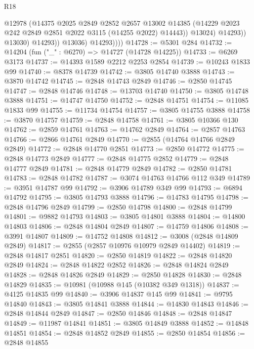 \begin{lexlean}{R18}
\begin{coremodule}
                          @12978
                          (@14375
                            @2025
                            @2849
                            @2852
                            @2657
                            @13002
                            @14385
                            (@14229 @2023 @242 @2849 @2851 @2022 @3115 (@14255 @2022) @14443))
                          @13024)
                        @14293))
                    @13030)
                  @14293))
              @13036)
            @14293))))
@14728 := @5301 @284
@14732 := @14204 (fun ("_" : @6270) => @14727 (@14728 @14225))
@14733 := @6269 @3173
@14737 := @14393 @1589 @2212 @2253 @2854
@14739 := @10243 @1833 @99
@14740 := @8378 @14739
@14742 := @3805 @14740 @3888
@14743 := @3870 @14742
@14745 := @2848 @14743 @2849
@14746 := @2850 @14745
@14747 := @2848 @14746
@14748 := @13703 @14740
@14750 := @3805 @14748 @3888
@14751 := @14747 @14750
@14752 := @2848 @14751
@14754 := @11085 @1833 @99
@14755 := @11734 @14754
@14757 := @3805 @14755 @3888
@14758 := @3870 @14757
@14759 := @2848 @14758
@14761 := @3805 @10366 @130
@14762 := @2859 @14761
@14763 := @14762 @2849
@14764 := @2857 @14763
@14766 := @2866 @14761 @2849
@14770 := @2855 (@14764 @14766 @2849 @2849)
@14772 := @2848 @14770 @2851
@14773 := @2850 @14772
@14775 := @2848 @14773 @2849
@14777 := @2848 @14775 @2852
@14779 := @2848 @14777 @2849
@14781 := @2848 @14779 @2849
@14782 := @2850 @14781
@14783 := @2848 @14782
@14787 := @3074 @14763 @14766 @112 @349
@14789 := @3951 @14787 @99
@14792 := @3906 @14789 @349 @99
@14793 := @6894 @14792
@14795 := @3805 @14793 @3888
@14796 := @14783 @14795
@14798 := @2848 @14796 @2849
@14799 := @2850 @14798
@14800 := @2848 @14799
@14801 := @9882 @14793
@14803 := @3805 @14801 @3888
@14804 := @14800 @14803
@14806 := @2848 @14804 @2849
@14807 := @14759 @14806
@14808 := @3991 @14807
@14809 := @14752 @14808
@14812 := @3008 (@2848 @14809 @2849)
@14817 := @2855 (@2857 @10976 @10979 @2849 @14402)
@14819 := @2848 @14817 @2851
@14820 := @2850 @14819
@14822 := @2848 @14820 @2849
@14824 := @2848 @14822 @2852
@14826 := @2848 @14824 @2849
@14828 := @2848 @14826 @2849
@14829 := @2850 @14828
@14830 := @2848 @14829
@14835 := @10981 (@10988 @145 (@10382 @349 @1318))
@14837 := @4125 @14835 @99
@14840 := @3906 @14837 @145 @99
@14841 := @9795 @14840
@14843 := @3805 @14841 @3888
@14844 := @14830 @14843
@14846 := @2848 @14844 @2849
@14847 := @2850 @14846
@14848 := @2848 @14847
@14849 := @11987 @14841
@14851 := @3805 @14849 @3888
@14852 := @14848 @14851
@14854 := @2848 @14852 @2849
@14855 := @2850 @14854
@14856 := @2848 @14855

\end{coremodule}
\end{lexlean}
